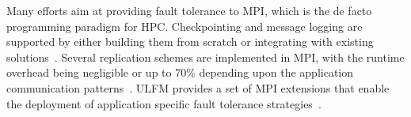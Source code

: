 

Many efforts aim at providing fault tolerance to MPI, which is the de facto programming paradigm for HPC. Checkpointing and message logging are supported by either building them from scratch or integrating with existing solutions~\cite{doi:10.1177/1094342005056139,bosilca2002mpich,7013060,4228333,Moody:10:SCR}. Several replication schemes are implemented in MPI, with the runtime overhead being negligible or up to 70\% depending upon the application communication patterns~\cite{engelmann2011redundant,ferreira_sc_2011,fiala_2012_sdc}. ULFM provides a set of MPI extensions that enable the deployment of application specific fault tolerance strategies~\cite{Bland2012}.